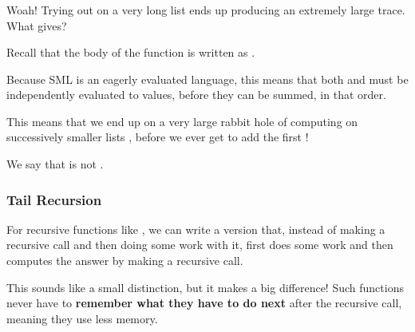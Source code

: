 \documentclass[aspectratio=169]{beamer}
\begin{document}
\begin{frame}[fragile]
  \frametitle{}

  Woah! Trying out  on a very long list ends up producing an extremely large trace.
  What gives? 

  \vspace{\fill}

  Recall that the body of the  function is written as . 
  
  \vspace{\fill}

  Because SML is an eagerly evaluated language, this means that both  and 
  must be independently evaluated to values, before they can be summed, in that order. 

  \vspace{\fill}

  This means that we end up on a very large rabbit hole of computing  on successively
  smaller lists , before we ever get to add the first !

  \vspace{\fill}

  We say that  is not .
\end{frame}

\begin{frame}[fragile]
  \frametitle{Tail Recursion}

  For recursive functions like , we can write a version that, instead of making a
  recursive call and then doing some work with it, first does some work and then computes the
  answer by making a recursive call.

  \vspace{\fill}

  This sounds like a small distinction, but it makes a big difference! Such functions never have
  to \textbf{remember what they have to do next} after the recursive call, meaning they use less
  memory.
  
  \vspace{\fill}

\end{frame}
\end{document}
